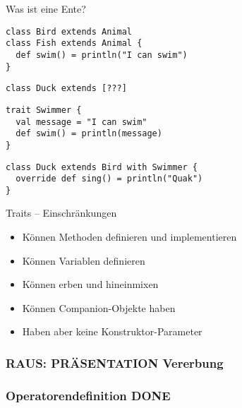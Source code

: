 \documentclass[14pt,aspectratio=169,trans]{beamer} %
\begin{document}
\begin{frame}[fragile]{}
	\begin{block}{Was ist eine Ente?}
		\scriptsize
		\onslide<2->
  \begin{lstlisting}
class Bird extends Animal
class Fish extends Animal {
  def swim() = println("I can swim")
}
	\end{lstlisting}
{
\begin{lstlisting}[firstnumber=4]
class Duck extends [???]
\end{lstlisting}
}
{
\begin{lstlisting}[firstnumber=9]
trait Swimmer {
  val message = "I can swim"
  def swim() = println(message)
}
\end{lstlisting}
}
{
\begin{lstlisting}[firstnumber=9]
class Duck extends Bird with Swimmer {
  override def sing() = println("Quak")
}
\end{lstlisting}
}
	\end{block}
	\note{}
\end{frame}


\begin{frame}{}
	\begin{block}{Traits -- Einschränkungen}
		\begin{itemize}
			\item<2->Können Methoden definieren und implementieren
			\item<3->Können Variablen definieren
			\item<4->Können erben und hineinmixen
			\item<5->Können Companion-Objekte haben
			\item<6->Haben aber keine Konstruktor-Parameter
		\end{itemize}
	\end{block}
\end{frame}

\subsubsection*{RAUS: PRÄSENTATION Vererbung}

\subsubsection*{Operatorendefinition DONE}
\end{document}

